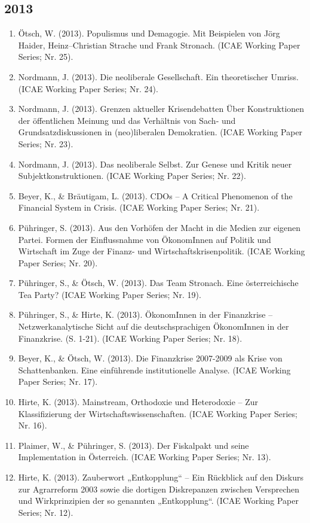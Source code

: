 \subsection*{2013}
\begin{enumerate}
	 \item Ötsch, W. (2013). Populismus und Demagogie. Mit Beispielen von Jörg Haider, Heinz–Christian Strache und Frank Stronach. (ICAE Working Paper Series; Nr. 25).
	 \item Nordmann, J. (2013). Die neoliberale Gesellschaft. Ein theoretischer Umriss. (ICAE Working Paper Series; Nr. 24).
	 \item Nordmann, J. (2013). Grenzen aktueller Krisendebatten Über Konstruktionen der öffentlichen Meinung und das Verhältnis von Sach‐ und Grundsatzdiskussionen in (neo)liberalen Demokratien. (ICAE Working Paper Series; Nr. 23).
	 \item Nordmann, J. (2013). Das neoliberale Selbst. Zur Genese und Kritik neuer Subjektkonstruktionen. (ICAE Working Paper Series; Nr. 22).
	 \item Beyer, K., \& Bräutigam, L. (2013). CDOs – A Critical Phenomenon of the Financial System in Crisis. (ICAE Working Paper Series; Nr. 21).
	 \item Pühringer, S. (2013). Aus den Vorhöfen der Macht in die Medien zur eigenen Partei. Formen der Einflussnahme von ÖkonomInnen auf Politik und Wirtschaft im Zuge der Finanz-­ und Wirtschaftskrisenpolitik. (ICAE Working Paper Series; Nr. 20).
	 \item Pühringer, S., \& Ötsch, W. (2013). Das Team Stronach. Eine österreichische Tea Party? (ICAE Working Paper Series; Nr. 19).
	 \item Pühringer, S., \& Hirte, K. (2013). ÖkonomInnen in der Finanzkrise -- Netzwerkanalytische Sicht auf die deutschsprachigen ÖkonomInnen in der Finanzkrise. (S. 1-21). (ICAE Working Paper Series; Nr. 18).
	 \item Beyer, K., \& Ötsch, W. (2013). Die Finanzkrise 2007-2009 als Krise von Schattenbanken. Eine einführende institutionelle Analyse. (ICAE Working Paper Series; Nr. 17).
	 \item Hirte, K. (2013). Mainstream, Orthodoxie und Heterodoxie -- Zur Klassifizierung der Wirtschaftswissenschaften. (ICAE Working Paper Series; Nr. 16).
	 \item Plaimer, W., \& Pühringer, S. (2013). Der Fiskalpakt und seine Implementation in Österreich. (ICAE Working Paper Series; Nr. 13).
	 \item Hirte, K. (2013). Zauberwort „Entkopplung“ – Ein Rückblick auf den Diskurs zur Agrarreform 2003 sowie die dortigen Diskrepanzen zwischen Versprechen und Wirkprinzipien der so genannten „Entkopplung“. (ICAE Working Paper Series; Nr. 12).
\end{enumerate}
